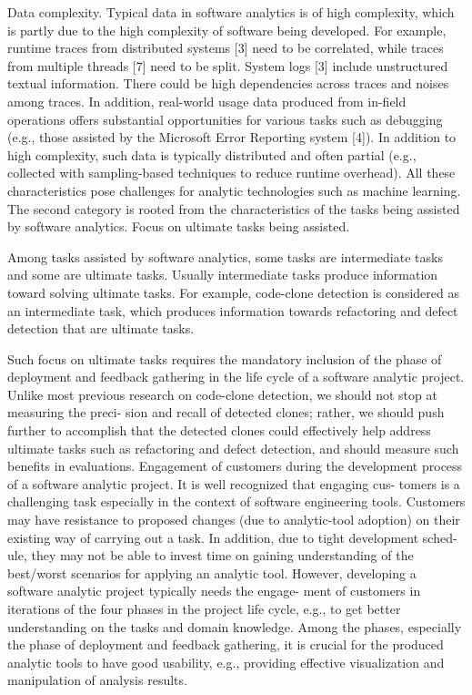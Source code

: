 Data complexity. 
Typical data in software analytics is of high complexity, which is partly due to the high complexity of software being developed. For example, runtime traces from distributed systems [3] need to be correlated, while traces from multiple threads [7] need to be split. System logs [3] include unstructured textual information. There could be high dependencies across traces and noises among traces. In addition, real-world usage data produced from in-field operations offers substantial opportunities for various tasks such as debugging (e.g., those assisted by the Microsoft Error Reporting system [4]). In addition to high complexity, such data is typically distributed and often partial (e.g., collected with sampling-based techniques to reduce runtime overhead). All these characteristics pose challenges for analytic technologies such as machine learning. The second category is rooted from the characteristics of the
tasks being assisted by software analytics. Focus on ultimate tasks being assisted. 

Among tasks assisted by software analytics, some tasks are intermediate tasks and some are ultimate tasks. Usually intermediate tasks produce information toward solving ultimate tasks. For example, code-clone detection is considered as an intermediate task, which produces information towards refactoring and defect detection that are ultimate tasks.

Such focus on ultimate tasks requires the mandatory inclusion of the phase of deployment and feedback gathering in the life cycle of a software analytic project. Unlike most previous research on code-clone detection, we should not stop at measuring the preci- sion and recall of detected clones; rather, we should push further to accomplish that the detected clones could effectively help address ultimate tasks such as refactoring and defect detection, and should measure such benefits in evaluations. Engagement of customers during the development process of a
software analytic project. It is well recognized that engaging cus- tomers is a challenging task especially in the context of software engineering tools. Customers may have resistance to proposed changes (due to analytic-tool adoption) on their existing way of carrying out a task. In addition, due to tight development sched- ule, they may not be able to invest time on gaining understanding of the best/worst scenarios for applying an analytic tool. However, developing a software analytic project typically needs the engage- ment of customers in iterations of the four phases in the project life cycle, e.g., to get better understanding on the tasks and domain knowledge. Among the phases, especially the phase of deployment and feedback gathering, it is crucial for the produced analytic tools to have good usability, e.g., providing effective visualization and manipulation of analysis results.



